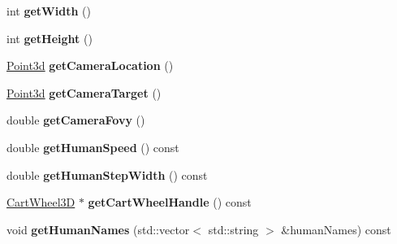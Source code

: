 \begin{DoxyCompactItemize}
\item 
\hypertarget{classCartWheel_1_1Visualization_a7186a5628ea4b3483392503dcd9f8a13}{
int {\bfseries getWidth} ()}
\label{classCartWheel_1_1Visualization_a7186a5628ea4b3483392503dcd9f8a13}

\item 
\hypertarget{classCartWheel_1_1Visualization_ac89f818f3968855836db5d6435fd354c}{
int {\bfseries getHeight} ()}
\label{classCartWheel_1_1Visualization_ac89f818f3968855836db5d6435fd354c}

\item 
\hypertarget{classCartWheel_1_1Visualization_a1c31d779c44fa429a87aff04feb8c577}{
\hyperlink{classCartWheel_1_1Math_1_1Point3d}{Point3d} {\bfseries getCameraLocation} ()}
\label{classCartWheel_1_1Visualization_a1c31d779c44fa429a87aff04feb8c577}

\item 
\hypertarget{classCartWheel_1_1Visualization_ade4c593cfe5486e3ff9866e5498c2b6e}{
\hyperlink{classCartWheel_1_1Math_1_1Point3d}{Point3d} {\bfseries getCameraTarget} ()}
\label{classCartWheel_1_1Visualization_ade4c593cfe5486e3ff9866e5498c2b6e}

\item 
\hypertarget{classCartWheel_1_1Visualization_a46dfa2029266900516668ae7e83dbed1}{
double {\bfseries getCameraFovy} ()}
\label{classCartWheel_1_1Visualization_a46dfa2029266900516668ae7e83dbed1}

\item 
\hypertarget{classCartWheel_1_1Visualization_ac8af085813529072b41e15bcf9d8257a}{
double {\bfseries getHumanSpeed} () const }
\label{classCartWheel_1_1Visualization_ac8af085813529072b41e15bcf9d8257a}

\item 
\hypertarget{classCartWheel_1_1Visualization_a494a3fb8dbcf74b44d47b3914682182b}{
double {\bfseries getHumanStepWidth} () const }
\label{classCartWheel_1_1Visualization_a494a3fb8dbcf74b44d47b3914682182b}

\item 
\hypertarget{classCartWheel_1_1Visualization_a08b2546283d5c0581545c8f56586d6a0}{
\hyperlink{classCartWheel_1_1CartWheel3D}{CartWheel3D} $\ast$ {\bfseries getCartWheelHandle} () const }
\label{classCartWheel_1_1Visualization_a08b2546283d5c0581545c8f56586d6a0}

\item 
\hypertarget{classCartWheel_1_1Visualization_afe24defbf1fa54472ebc9af399d1d476}{
void {\bfseries getHumanNames} (std::vector$<$ std::string $>$ \&humanNames) const }
\label{classCartWheel_1_1Visualization_afe24defbf1fa54472ebc9af399d1d476}


\end{DoxyCompactItemize}
